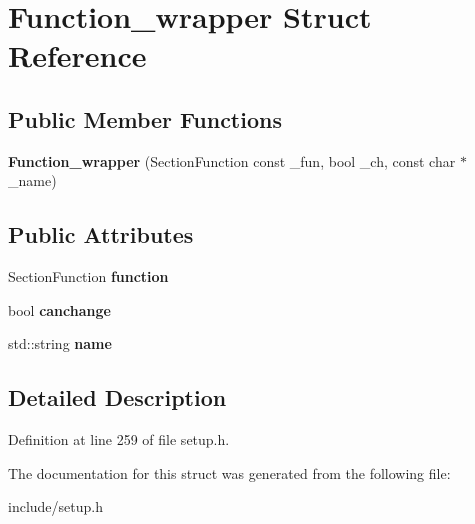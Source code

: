 \hypertarget{structFunction__wrapper}{\section{Function\-\_\-wrapper Struct Reference}
\label{structFunction__wrapper}
}
\subsection*{Public Member Functions}
\begin{DoxyCompactItemize}
\item 
\hypertarget{structFunction__wrapper_a42e855bf8f4ff2cdb3b3fc61982a0e2a}{{\bfseries Function\-\_\-wrapper} (Section\-Function const \-\_\-fun, bool \-\_\-ch, const char $\ast$\-\_\-name)}\label{structFunction__wrapper_a42e855bf8f4ff2cdb3b3fc61982a0e2a}

\end{DoxyCompactItemize}
\subsection*{Public Attributes}
\begin{DoxyCompactItemize}
\item 
\hypertarget{structFunction__wrapper_a37c15a5a48deb464bfbcf0ac2aeed1f4}{Section\-Function {\bfseries function}}\label{structFunction__wrapper_a37c15a5a48deb464bfbcf0ac2aeed1f4}

\item 
\hypertarget{structFunction__wrapper_a07ef638dcc9ab91a2649aeebf09685a6}{bool {\bfseries canchange}}\label{structFunction__wrapper_a07ef638dcc9ab91a2649aeebf09685a6}

\item 
\hypertarget{structFunction__wrapper_a5272f1f398f64bf611d1b6d3fd8848cb}{std\-::string {\bfseries name}}\label{structFunction__wrapper_a5272f1f398f64bf611d1b6d3fd8848cb}

\end{DoxyCompactItemize}


\subsection{Detailed Description}


Definition at line 259 of file setup.\-h.



The documentation for this struct was generated from the following file\-:\begin{DoxyCompactItemize}
\item 
include/setup.\-h\end{DoxyCompactItemize}
